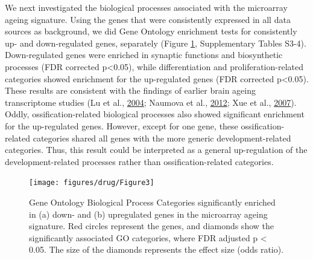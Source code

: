 \documentclass[12pt,twoside]{unicam}
\begin{document}
We next investigated the biological processes associated with the microarray ageing signature. Using the genes that were consistently expressed in all data sources as background, we did Gene Ontology enrichment tests for consistently up- and down-regulated genes, separately (Figure \ref{fig:drugFig3}, Supplementary Tables S3-4). Down-regulated genes were enriched in synaptic functions and biosynthetic processes (FDR corrected p\textless0.05), while differentiation and proliferation-related categories showed enrichment for the up-regulated genes (FDR corrected p\textless0.05). These results are consistent with the findings of earlier brain ageing transcriptome studies (Lu et al., \protect\hyperlink{ref-Lu2004}{2004}; Naumova et al., \protect\hyperlink{ref-Naumova2012}{2012}; Xue et al., \protect\hyperlink{ref-Xue2007}{2007}). Oddly, ossification-related biological processes also showed significant enrichment for the up-regulated genes. However, except for one gene, these ossification-related categories shared all genes with the more generic development-related categories. Thus, this result could be interpreted as a general up-regulation of the development-related processes rather than ossification-related categories.

\begin{figure}

{\centering \texttt{[image: figures/drug/Figure3]} 

}

\caption[GO Enrichment results for the ageing signature.]{Gene Ontology Biological Process Categories significantly enriched in (a) down- and (b) upregulated genes in the microarray ageing signature. Red circles represent the genes, and diamonds show the significantly associated GO categories, where FDR adjusted p < 0.05. The size of the diamonds represents the effect size (odds ratio).}\label{fig:drugFig3}
\end{figure}
\end{document}
